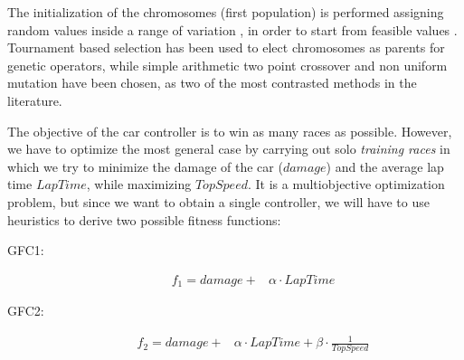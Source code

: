 \documentclass[conference]{IEEEtran}
\begin{document}

The initialization of the chromosomes (first population) is performed assigning random values inside a range of variation \cite{GAs_Goldberg89}, in order to start from feasible values \cite{evo17}.
Tournament based selection has been used to elect chromosomes as parents for genetic operators, while simple arithmetic two point crossover \cite{crossGA2017} and non uniform mutation \cite{mutation1997} have been chosen, as two of the most contrasted methods in the literature.



The objective of the car controller is to win as many races as
possible. However, we have to optimize the most general case by
carrying out
solo {\em training races} in which we try to minimize the damage of
the car ($damage$) and the average lap time $LapTime$, while
maximizing $TopSpeed$. It is a multiobjective optimization problem,
but since we want to obtain a single controller, we will have to use
heuristics to derive two possible fitness functions:

\begin{description}
	\item[GFC1:]  
	\begin{equation} \label{fit1}
	\begin{array}{ll}
	f_{1} =   damage + &\alpha \cdot LapTime 
	\end{array}
	\end{equation}
	\item[GFC2:] 
	\begin{equation} \label{fit2}
	\begin{array}{lll}
	f_{2}= damage + &\alpha \cdot  LapTime + \beta \cdot \frac{1}{TopSpeed}
	\end{array}
	\end{equation}	
\end{description} %
\end{document}
